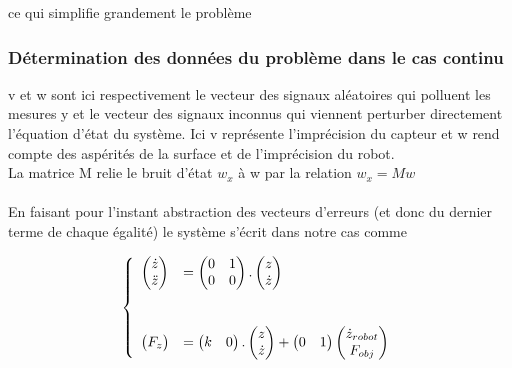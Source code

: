 \documentclass[12pt,twoside,a4paper]{article}
\begin{document}
ce qui simplifie grandement le problème

\subsubsection{Détermination des données du problème dans le cas continu}


v et w sont ici respectivement le vecteur des signaux aléatoires qui polluent les mesures y et le vecteur  des signaux inconnus qui viennent perturber directement l'équation d'état du système. Ici  v représente l'imprécision du capteur et w rend compte des aspérités de la surface et de l'imprécision du robot. \\
La matrice M relie le bruit d'état $w_x$ à w par la relation $w_x = Mw$ \\
\vspace {1cm} \\
En faisant pour l'instant abstraction des vecteurs d'erreurs (et donc du dernier terme de chaque égalité) le système s'écrit dans notre cas comme  

$$
\left\{ 
\begin{array}{ll}
        \begin{pmatrix} \dot{z} \\ \ddot{z} \end{pmatrix} 
        &= \begin{pmatrix}
        0 & 1 \\
        0 & 0 \\ 
        \end{pmatrix}.
        \begin{pmatrix} z  \\ \dot{z} \end{pmatrix} \\
        \vspace{0.5cm} \\
        \begin{pmatrix} F_z  \end{pmatrix}
         &= \begin{pmatrix} k & 0 \end{pmatrix}.
	 	\begin{pmatrix} z \\  \dot{z} \end{pmatrix} 
	+ \begin{pmatrix} 0 & 1 \end{pmatrix}
	 \begin{pmatrix} \dot{z}_{robot} \\ F_{obj}\end{pmatrix}\\
\end{array}
\right.
$$
\end{document}
